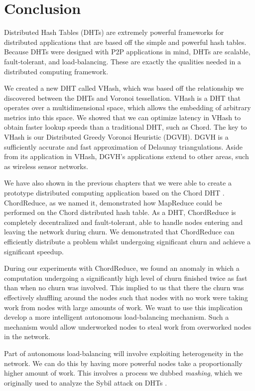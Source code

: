 \chapter{Conclusion}
\label{chapter:conclusion}
Distributed Hash Tables (DHTs) are extremely powerful frameworks for distributed applications that are based off the simple and powerful hash tables.
Because DHTs were designed with P2P applications in mind, DHTs are scalable, fault-tolerant, and load-balancing.
These are exactly the qualities needed in a distributed computing framework.

We created a new DHT called VHash, which was based off the relationship we discovered between the DHTs and Voronoi tessellation.
VHash is a DHT that operates over a multidimensional space, which allows the embedding of arbitrary metrics into this space.
We showed that we can optimize latency in VHash to obtain faster lookup speeds than a traditional DHT, such as Chord.
The key to VHash is our Distributed Greedy Voronoi Heuristic (DGVH).
DGVH is a sufficiently accurate and fast approximation of Delaunay triangulations.
Aside from its application in VHash, DGVH's applications extend to other areas, such as wireless sensor networks.

We have also shown in the previous chapters that we were able to create a prototype distributed computing application \cite{chordreduce} based on the Chord DHT \cite{chord}.
ChordReduce, as we named it, demonstrated how MapReduce could be performed on the Chord distributed hash table.
As a DHT, ChordReduce is completely decentralized and fault-tolerant, able to handle  nodes entering and leaving the network during churn.
We demonstrated that ChordReduce can efficiently distribute a problem whilst undergoing significant churn and achieve a significant speedup.

During our experiments with ChordReduce, we found an anomaly in which a computation undergoing a significantly high level of churn finished twice as fast than when no churn was involved.
This implied to us that there the churn was effectively shuffling around the nodes such that nodes with no work were taking work from nodes with large amounts of work.
We want to use this implication  develop a more intelligent autonomous load-balancing mechanism.
Such a mechanism would allow underworked nodes to steal work from overworked nodes in the network.

Part of autonomous load-balancing will involve exploiting heterogeneity in the network.
We can do this by having more powerful nodes take a proportionally higher amount of work.
This involves a process we dubbed \textit{mashing}, which we originally used to analyze the Sybil attack on DHTs \cite{sybil-analysis}.



